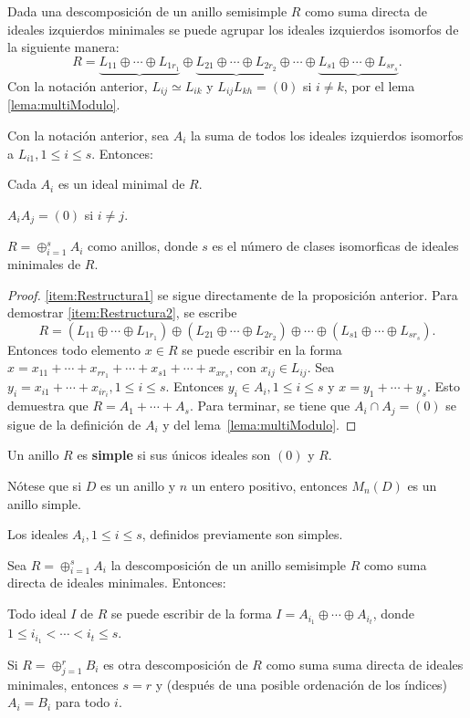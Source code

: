 Dada una descomposición de un anillo semisimple $R$ como suma directa de ideales izquierdos minimales se puede agrupar los ideales izquierdos isomorfos de la siguiente manera:
\[ R = \underbrace{L_{11}\oplus \cdots \oplus L_{1r_1}} \oplus \underbrace{L_{21}\oplus \cdots \oplus L_{2r_2}} \oplus \cdots  \oplus \underbrace{L_{s1}\oplus \cdots \oplus L_{sr_s}}. \]
Con la notación anterior, $L_{ij} \simeq L_{ik}$ y $L_{ij}L_{kh} = (0)$ si $i \neq k$, por el lema \ref{lema:multiModulo}. 
\begin{teorema}
Con la notación anterior, sea $A_i$ la suma de todos los ideales izquierdos isomorfos a $L_{i1}, 1\leq i \leq s$. Entonces:
\begin{bulletList}
\item\label{item:Restructura1} Cada $A_i$ es un ideal minimal de $R$.
\item\label{item:Restructura2} $A_iA_j = (0)$ si $i \neq j$.
\item\label{item:Restructura3} $R = \oplus_{i=1}^{s}A_i$ como anillos, donde $s$ es el número de clases isomorficas de ideales minimales de $R$.
\end{bulletList}
\end{teorema}
\begin{proof}
\ref{item:Restructura1} se sigue directamente de la proposición anterior. Para demostrar \ref{item:Restructura2}, se escribe \[ R = (L_{11}\oplus \cdots \oplus L_{1r_1}) \oplus (L_{21}\oplus \cdots \oplus L_{2r_2}) \oplus \cdots  \oplus (L_{s1}\oplus \cdots \oplus L_{sr_s}). \]Entonces todo elemento $x \in R$ se puede escribir en la forma $x = x_{11} + \cdots + x_{rr_1} + \cdots + x_{s1} +\cdots +x_{xr_s}$, con $x_{ij} \in L_{ij}$. Sea $y_i = x_{i1} + \cdots + x_{ir_i}, 1\leq i \leq s$. Entonces $y_i \in A_i, 1\leq i \leq s$ y $x = y_1 + \cdots + y_s$. Esto demuestra que $R = A_1 + \cdots + A_s$. Para terminar, se tiene que $A_i\cap A_j = (0)$ se sigue de la definición de $A_i$ y del lema~\ref{lema:multiModulo}. 
\end{proof}
\begin{definicion}
Un anillo $R$ es \textbf{simple} si sus únicos ideales son $(0)$ y $R$.
\end{definicion}
Nótese que si $D$ es un anillo y $n$ un entero positivo, entonces $M_n(D)$ es un anillo simple.
\begin{corolario}
Los ideales $A_i, 1\leq i \leq s$, definidos previamente son simples.
\end{corolario}
\begin{proposicion}\label{prop:unicidadDescomposicion}
Sea $R = \oplus_{i=1}^s A_i$ la descomposición de un anillo semisimple $R$ como suma directa de ideales minimales. Entonces:
\begin{bulletList}
\item Todo ideal $I$ de $R$ se puede escribir de la forma $I = A_{i_1} \oplus \cdots \oplus A_{i_t}$, donde $1\leq i_{i_1} < \cdots < i_{t} \leq s$.
\item Si $R = \oplus_{j = 1}^rB_i$ es otra descomposición de $R$ como suma suma directa de ideales minimales, entonces $s = r$ y (después de una posible ordenación de los índices) $A_i = B_i$ para todo $i$.
\end{bulletList}
\end{proposicion}
